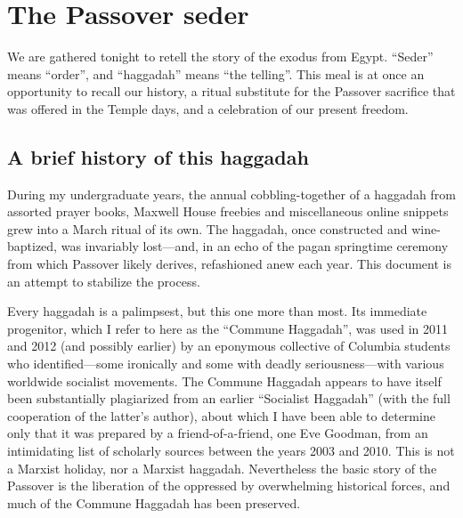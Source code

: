 \documentclass[a4paper,10pt,openany]{memoir}
\begin{document}
%
%
%

\chapter*{The Passover seder}

We are gathered tonight to retell the story of the exodus from Egypt. ``Seder''
means ``order'', and ``haggadah'' means ``the telling''. This meal is at once an
opportunity to recall our history, a ritual substitute for the Passover
sacrifice that was offered in the Temple days, and a celebration of our present
freedom.

\section*{A brief history of this haggadah}

During my undergraduate years, the annual cobbling-together of a haggadah from
assorted prayer books, Maxwell House freebies and miscellaneous online snippets
grew into a March ritual of its own. The haggadah, once constructed and
wine-baptized, was invariably lost---and, in an echo of the pagan springtime
ceremony from which Passover likely derives, refashioned anew each year.  This
document is an attempt to stabilize the process.

Every haggadah is a palimpsest, but this one more than most. Its immediate
progenitor, which I refer to here as the ``Commune Haggadah'', was used in 2011
and 2012 (and possibly earlier) by an eponymous collective of Columbia students
who identified---some ironically and some with deadly seriousness---with various
worldwide socialist movements. The Commune Haggadah appears to have itself been
substantially plagiarized from an earlier ``Socialist Haggadah'' (with the full
cooperation of the latter's author), about which I have been able to determine
only that it was prepared by a friend-of-a-friend, one Eve Goodman, from an
intimidating list of scholarly sources between the years 2003 and 2010.
%
This is not a Marxist holiday, nor a Marxist haggadah. Nevertheless the basic
story of the Passover is the liberation of the oppressed by overwhelming
historical forces, and much of the Commune Haggadah has been preserved.
\end{document}
